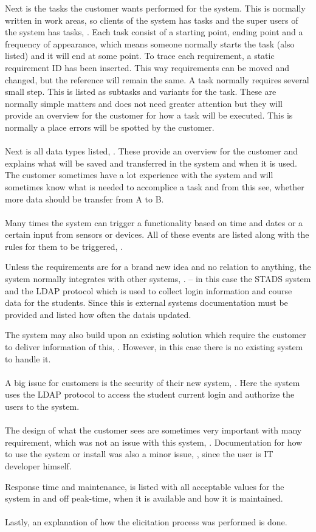 \documentclass[Main]{subfiles}
\begin{document}
Next is the tasks the customer wants performed for the system.
This is normally written in work areas, so clients of the system has tasks and the super users of the system has tasks, \parencite[8-13]{HI4}.
Each task consist of a starting point, ending point and a frequency of appearance, which means someone normally starts the task (also listed) and it will end at some point.
To trace each requirement, a static requirement ID has been inserted.
This way requirements can be moved and changed, but the reference will remain the same.
A task normally requires several small step.
This is listed as subtasks and variants for the task. 
These are normally simple matters and does not need greater attention but they will provide an overview for the customer for how a task will be executed.
This is normally a place errors will be spotted by the customer.
\\
\\
Next is all data types listed, \parencite[14-17]{HI4}.
These provide an overview for the customer and explains what will be saved and transferred in the system and when it is used.
The customer sometimes have a lot experience with the system and will sometimes know what is needed to accomplice a task and from this see, whether more data should be transfer from A to B.
\\
\\
Many times the system can trigger a functionality based on time and dates or a certain input from sensors or devices.
All of these events are listed along with the rules for them to be triggered, \parencite[18]{HI4}.

Unless the requirements are for a brand new idea and no relation to anything, the system normally integrates with other systems, \parencite[19-20]{HI4}. -- in this case the STADS system and the LDAP protocol which is used to collect login information and course data for the students. 
Since this is external systems documentation must be provided and listed how often the datais updated.

The system may also build upon an existing solution which require the customer to deliver information of this, \parencite[21]{HI4}.
However, in this case there is no existing system to handle it.
\\
\\
A big issue for customers is the security of their new system, \parencite[22]{HI4}.
Here the system uses the LDAP protocol to access the student current login and authorize the users to the system.
\\
\\
The design of what the customer sees are sometimes very important with many requirement, which was not an issue with this system, \parencite[23]{HI4}.
Documentation for how to use the system or install was also a minor issue, \parencite[24]{HI4}, since the user is IT developer himself.

Response time and maintenance, \parencite[25-27]{HI4} is listed with all acceptable values for the system in and off peak-time, when it is available and how it is maintained.
\\
\\
Lastly, an explanation of how the elicitation process was performed is done.
\end{document}
